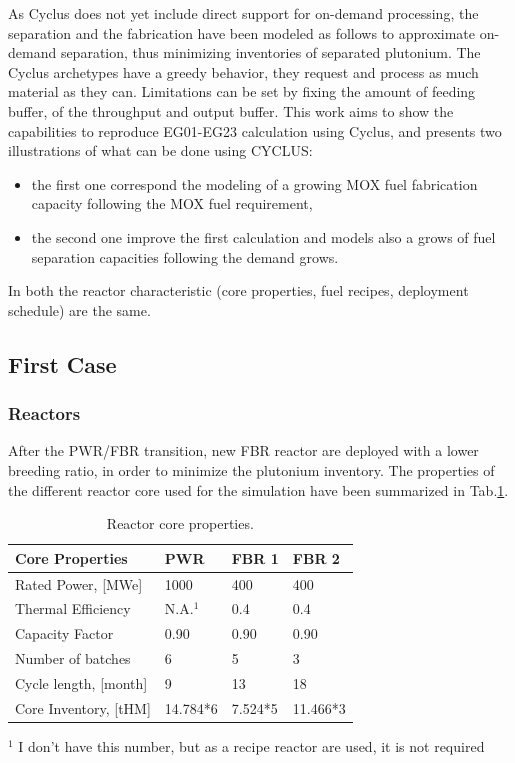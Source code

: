 \documentclass[12pt]{article}
\begin{document}
As Cyclus does not yet include direct support for
on-demand processing, the separation and the
fabrication have been modeled as follows to
approximate on-demand separation, thus minimizing
inventories of separated plutonium.
The Cyclus archetypes have a greedy behavior, they
request and process as much material as they can.
Limitations can be set by fixing the amount of
feeding buffer, of the throughput and output
buffer.
This work aims to show the capabilities to
reproduce EG01-EG23 calculation using Cyclus, and
presents two illustrations of what can be done
using CYCLUS:
\begin{itemize}
\item the first one correspond the modeling
of a growing MOX fuel fabrication capacity
following the MOX fuel requirement,
\item the second one improve the first calculation and
models also a grows of fuel separation capacities
following the demand grows.
\end{itemize}
In both the reactor characteristic (core
properties, fuel recipes, deployment schedule) are
the same.

\subsection{First Case}
\subsubsection{Reactors}
After the PWR/FBR transition, new FBR reactor are
deployed with a lower breeding ratio, in order to
minimize the plutonium inventory. The properties
of the different reactor core used for the
simulation have been summarized in
Tab.\ref{tab:reactor}.\\
\begin{table}[h!]
\centering
\begin{tabularx}{350pt}{lXXX}
\hline
Core Properties       &	PWR     &	FBR 1   &	FBR 2     \\
\hline
Rated Power, [MWe]    &	1000		&	400     &	400       \\
Thermal Efficiency    &	N.A.$^1$	&	0.4     &	0.4       \\
Capacity Factor       &	0.90		&	0.90		&	0.90      \\
Number of batches     &	6       &	5       &	3         \\
Cycle length, [month] &	9       &	13      &	18        \\
Core Inventory, [tHM] &	14.784*6&	7.524*5	&	11.466*3  \\
\hline
\end{tabularx}
\caption{Reactor core properties.}
\label{tab:reactor}
\footnotesize{$^1$ I don't have this number, but as a recipe reactor are used, it is not required}
\end{table}
\end{document}
